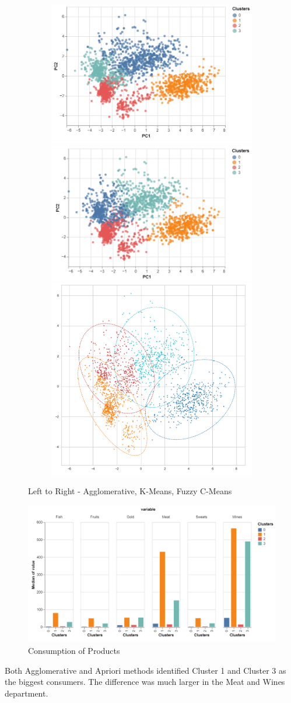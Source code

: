 \documentclass[12pt]{article}
\begin{document}
\begin{figure}[H]
  \begin{subfigure}{\linewidth}
  \includegraphics[width=.3\linewidth]{figures/Agglomerative_clusters.PNG}\hfill
  \includegraphics[width=.3\linewidth]{figures/KMeans_clusters.PNG}\hfill
  \includegraphics[width=.3\linewidth]{figures/FuzzyCMeans_clusters.PNG}\hfill
  \end{subfigure}
  \caption{Left to Right - Agglomerative, K-Means, Fuzzy C-Means}
\end{figure}

\begin{figure}[H]
  \includegraphics[width=\linewidth]{figures/Clusters_consumption.PNG}\hfill
  \caption{Consumption of Products}
\end{figure}
\noindent Both Agglomerative and Apriori methods identified Cluster 1 and Cluster 3 as the biggest consumers. The difference was much larger in the Meat and Wines department. \\
\end{document}
